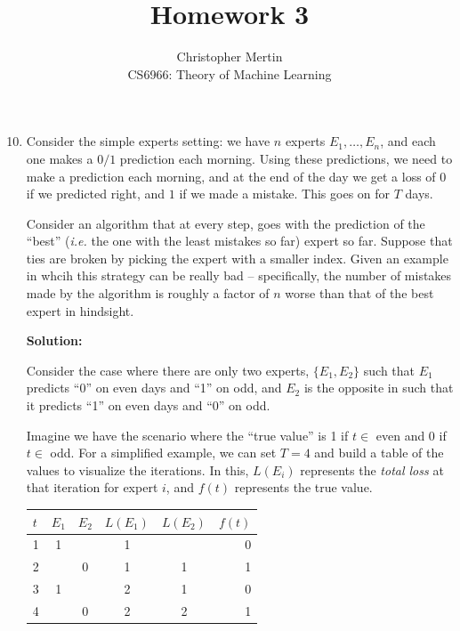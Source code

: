 \documentclass[12pt]{article}
\begin{document}
 
 
\title{Homework 3}%
\author{Christopher Mertin\\ %
CS6966: Theory of Machine Learning} %
 
\maketitle

\begin{enumerate}
  \setcounter{enumi}{9}
\item Consider the simple experts setting: we have $n$ experts $E_{1}, \ldots, E_{n}$, and each one makes a $0/1$ prediction each morning. Using these predictions, we need to make a prediction each morning, and at the end of the day we get a loss of $0$ if we predicted right, and $1$ if we made a mistake. This goes on for $T$ days.

Consider an algorithm that at every step, goes with the prediction of the ``best'' ({\em i.e.} the one with the least mistakes so far) expert so far. Suppose that ties are broken by picking the expert with a smaller index. Given an example in whcih this strategy can be really bad -- specifically, the number of mistakes made by the algorithm is roughly a factor of $n$ worse than that of the best expert in hindsight. 

{\bf Solution:}

Consider the case where there are only two experts, $\{ E_{1}, E_{2}\}$ such that $E_{1}$ predicts ``0'' on even days and ``1'' on odd, and $E_{2}$ is the opposite in such that it predicts ``1'' on even days and ``0'' on odd.

Imagine we have the scenario where the ``true value'' is 1 if $t \in $ even and 0 if $t \in $ odd. For a simplified example, we can set $T=4$ and build a table of the values to visualize the iterations. In this, $L(E_{i})$ represents the {\em total loss} at that iteration for expert $i$, and $f(t)$ represents the true value.

\begin{table}[H]
\centering
\begin{tabular}{@{}l c c c c | r@{}}
\hline\hline
$t$ & $E_{1}$ & $E_{2}$ & $L(E_{1})$ & $L(E_{2})$ & $f(t)$\\
\hline
1   & 1      &        & 1          &           &   0\\
2   &        & 0      & 1          & 1         &   1\\
3   & 1      &        & 2          & 1         &   0\\
4   &        & 0      & 2          & 2         &   1\\
\hline
\end{tabular}
\end{table}


\end{enumerate}
\end{document}
